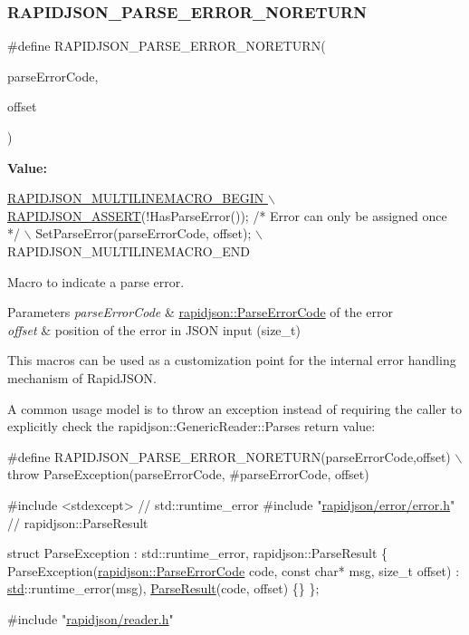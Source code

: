 \subsubsection{\texorpdfstring{R\+A\+P\+I\+D\+J\+S\+O\+N\+\_\+\+P\+A\+R\+S\+E\+\_\+\+E\+R\+R\+O\+R\+\_\+\+N\+O\+R\+E\+T\+U\+RN}{RAPIDJSON\_PARSE\_ERROR\_NORETURN}}
{\footnotesize\ttfamily \#define R\+A\+P\+I\+D\+J\+S\+O\+N\+\_\+\+P\+A\+R\+S\+E\+\_\+\+E\+R\+R\+O\+R\+\_\+\+N\+O\+R\+E\+T\+U\+RN(\begin{DoxyParamCaption}\item[{}]{parse\+Error\+Code,  }\item[{}]{offset }\end{DoxyParamCaption})}

{\bfseries Value\+:}
\begin{DoxyCode}
\hyperlink{a00636_gabeba18d612187bad2ac62aed9276d47c}{RAPIDJSON\_MULTILINEMACRO\_BEGIN \(\backslash\)}
\hyperlink{a00636_gabeba18d612187bad2ac62aed9276d47c}{    RAPIDJSON\_ASSERT}(!HasParseError()); \textcolor{comment}{/* Error can only be assigned once */} \(\backslash\)
    SetParseError(parseErrorCode, offset); \(\backslash\)
    RAPIDJSON\_MULTILINEMACRO\_END
\end{DoxyCode}


Macro to indicate a parse error. 


\begin{DoxyParams}{Parameters}
{\em parse\+Error\+Code} & \hyperlink{a00635_ga8d4b32dfc45840bca189ade2bbcb6ba7}{rapidjson\+::\+Parse\+Error\+Code} of the error \\
\hline
{\em offset} & position of the error in J\+S\+ON input ({\ttfamily size\+\_\+t})\\
\hline
\end{DoxyParams}
This macros can be used as a customization point for the internal error handling mechanism of Rapid\+J\+S\+ON.

A common usage model is to throw an exception instead of requiring the caller to explicitly check the rapidjson\+::\+Generic\+Reader\+::\+Parse\textquotesingle{}s return value\+:


\begin{DoxyCode}
\textcolor{preprocessor}{#define RAPIDJSON\_PARSE\_ERROR\_NORETURN(parseErrorCode,offset) \(\backslash\)}
\textcolor{preprocessor}{   throw ParseException(parseErrorCode, #parseErrorCode, offset)}

\textcolor{preprocessor}{#include <stdexcept>}               \textcolor{comment}{// std::runtime\_error}
\textcolor{preprocessor}{#include "\hyperlink{a00488}{rapidjson/error/error.h}"} \textcolor{comment}{// rapidjson::ParseResult}

\textcolor{keyword}{struct }ParseException : std::runtime\_error, rapidjson::ParseResult \{
  ParseException(\hyperlink{a00635_ga8d4b32dfc45840bca189ade2bbcb6ba7}{rapidjson::ParseErrorCode} code, \textcolor{keyword}{const} \textcolor{keywordtype}{char}* msg, \textcolor{keywordtype}{size\_t} offset)
    : \hyperlink{a00637}{std}::runtime\_error(msg), \hyperlink{a02188}{ParseResult}(code, offset) \{\}
\};

\textcolor{preprocessor}{#include "\hyperlink{a00563}{rapidjson/reader.h}"}
\end{DoxyCode}


